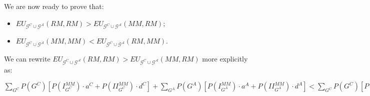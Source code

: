\documentclass[fleqn,reqno,11pt]{article}
\begin{document}
\medskip{}


We are now ready to prove that: 
\begin{itemize}
\item[(i')] $EU_{\mathcal{G}^{C}\cup\mathcal{G^{A}}}(RM,RM)>EU_{\mathcal{G}^{C}\cup\mathcal{G^{A}}}(MM,RM);$
\item[(ii')] $EU_{\mathcal{G}^{C}\cup\mathcal{G^{A}}}(MM,MM)<EU_{\mathcal{G}^{C}\cup\mathcal{G^{A}}}(RM,MM).$
\end{itemize}
We can rewrite $EU_{\mathcal{G}^{C}\cup\mathcal{G^{A}}}(RM,RM)>EU_{\mathcal{G}^{C}\cup\mathcal{G^{A}}}(MM,RM)$
more explicitly as:

\medskip{}

\noindent $\sum_{G^{C}}P(G^{C})[P(I_{G^{C}}^{MM})\cdot a^{C}+P(II_{G^{C}}^{MM})\cdot d^{C}]+\sum_{G^{A}}P(G^{A})[P(I_{G^{A}}^{MM})\cdot a^{A}+P(II_{G^{A}}^{MM})\cdot d^{A}]<\sum_{G^{C}}P(G^{C})[P(I_{G^{C}}^{MM}\cap I_{G^{C}}^{RM})\cdot a^{C}+P(II_{G^{C}}^{MM}\cap II_{G^{C}}^{RM})\cdot d^{C}+P(I_{G^{C}}^{MM}\cap II_{G^{C}}^{RM})\cdot c^{C}+P(II_{G^{C}}^{MM}\cap I_{G^{C}}^{RM})\cdot b^{C}]+\sum_{G^{A}}P(G^{A})[P(I_{G^{A}}^{MM}\cap I_{G^{A}}^{RM})\cdot a^{A}+P(II_{G^{A}}^{MM}\cap II_{G^{A}}^{RM})\cdot d^{A}+P(I_{G^{A}}^{MM}\cap II_{G^{A}}^{RM})\cdot c^{A}+P(II_{G^{A}}^{MM}\cap I_{G^{A}}^{RM})\cdot b^{A}]$

\medskip{}
\end{document}
